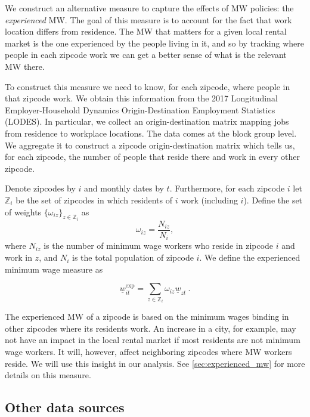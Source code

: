 We construct an alternative measure to capture the effects of MW policies: the 
\textit{experienced} MW. The goal of this measure is to account for the fact that work 
location differs from residence. The MW that matters for a given local rental market 
is the one experienced by the people living in it, and so by tracking where people in 
each zipcode work we can get a better sense of what is the relevant MW there.

To construct this measure we need to know, for each zipcode, where people in that 
zipcode work. We obtain this information from the 2017 Longitudinal Employer-Household 
Dynamics Origin-Destination Employment Statistics (LODES). In particular, we collect an 
origin-destination matrix mapping jobs from residence to workplace locations. The data 
comes at the block group level. We aggregate it to construct a zipcode origin-destination
matrix which tells us, for each zipcode, the number of people that reside there and work 
in every other zipcode. 

Denote zipcodes by $i$ and monthly dates by $t$. Furthermore, for each zipcode $i$ let 
$\mathds{Z}_i$ be the set of zipcodes in which residents of $i$ work (including $i$). 
Define the set of weights $\{\omega_{iz}\}_{z \in \mathds{Z}_i}$ as $$\omega_{iz} = 
\frac{N_{iz}}{N_i} , $$ where $N_{iz}$ is the number of minimum wage workers who reside 
in zipcode $i$ and work in $z$, and $N_i$ is the total population of zipcode $i$. We 
define the experienced minimum wage measure as

\begin{equation}
	\underline{w}^{\text{exp}}_{it} = \sum_{z \in \mathds{Z}_i} \omega_{iz} \underline{w}_{zt} \ . 
\end{equation}

The experienced MW of a zipcode is based on the minimum wages binding in other zipcodes 
where its residents work. An increase in a city, for example, may not have an impact in 
the local rental market if most residents are not minimum wage workers. It will, however, 
affect neighboring zipcodes where MW workers reside. We will use this insight in our 
analysis. See \autoref{sec:experienced_mw} for more details on this measure.

\subsection{Other data sources}

